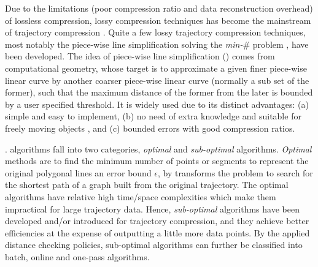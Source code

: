 Due to the  limitations (poor compression ratio and data reconstruction overhead) of lossless compression,  lossy compression techniques has become the mainstream of trajectory compression \cite{Lin:Operb,Zhang:Evaluation}. Quite a few lossy trajectory compression techniques, most notably the piece-wise line simplification \cite{Douglas:Peucker, Hershberger:Speeding, Keogh:online,Liu:BQS, Muckell:Compression, Chen:Trajectory, Chen:Fast, Cao:Spatio, Shi:Survey} solving the \emph{min-$\#$} problem \cite{Chan:Optimal, Imai:Optimal,Pavlidis:Segment}, have been developed. The idea of piece-wise line simplification (\lsa) comes from computational geometry, whose target is to approximate a given finer piece-wise linear curve by another coarser piece-wise linear curve ({normally} a sub set of the former), such that the maximum distance of the former from the later is bounded by a user specified threshold. It is widely used due to its distinct advantages: (a) simple and easy to implement, (b) no need of extra knowledge and suitable for freely  moving  objects \cite{Popa:Spatio}, and (c) bounded errors with good compression ratios.

%


. \lsa algorithms fall into two categories, \ie \textit{optimal} and \textit{sub-optimal} algorithms.
\textit{Optimal} methods\cite{Imai:Optimal,Chan:Optimal} are to find the minimum number of points or segments to represent the original polygonal lines \wrt an error bound $\epsilon$, by transforms the problem to search for the shortest path of a graph built from the original trajectory.
The optimal \lsa algorithms have relative high time/space complexities which make them impractical for large trajectory data.
Hence, \textit{sub-optimal} \lsa algorithms have been developed and/or introduced for trajectory compression, and they achieve better efficiencies at the expense of outputting a little more data points. By the applied distance checking policies, sub-optimal algorithms can further be classified into
batch, online and one-pass algorithms.

